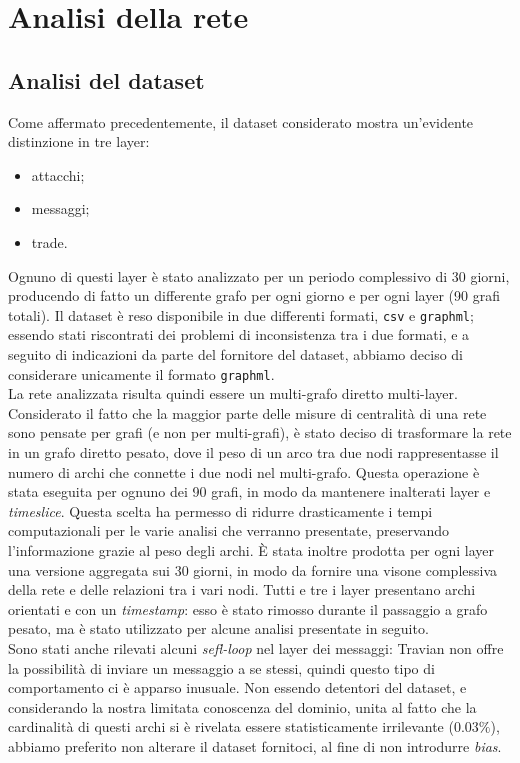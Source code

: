 \chapter{Analisi della rete}
\section{Analisi del dataset}
Come affermato precedentemente, il dataset considerato mostra un'evidente distinzione in tre layer:
\begin{itemize}
	\item attacchi;
	\item messaggi;
	\item trade.
\end{itemize}
Ognuno di questi layer è stato analizzato per un periodo complessivo di 30 giorni, producendo di fatto un differente grafo per ogni giorno e per ogni layer (90 grafi totali).
Il dataset è reso disponibile in due differenti formati, \texttt{csv} e \texttt{graphml}; essendo stati riscontrati dei problemi di inconsistenza tra i due formati, e a seguito di indicazioni da parte del fornitore del dataset, abbiamo deciso di considerare unicamente il formato \texttt{graphml}.\\

La rete analizzata risulta quindi essere un multi-grafo diretto multi-layer. Considerato il fatto che la maggior parte delle misure di centralità di una rete sono pensate per grafi (e non per multi-grafi), è stato deciso di trasformare la rete in un grafo diretto pesato, dove il peso di un arco tra due nodi rappresentasse il numero di archi che connette i due nodi nel multi-grafo. Questa operazione è stata eseguita per ognuno dei 90 grafi, in modo da mantenere inalterati layer e \textit{timeslice}. Questa scelta ha permesso di ridurre drasticamente i tempi computazionali per le varie analisi che verranno presentate, preservando l'informazione grazie al peso degli archi.
È stata inoltre prodotta per ogni layer una versione aggregata sui 30 giorni, in modo da fornire una visone complessiva della rete e delle relazioni tra i vari nodi.
Tutti e tre i layer presentano archi orientati e con un \textit{timestamp}: esso è stato rimosso durante il passaggio a grafo pesato, ma è stato utilizzato per alcune analisi presentate in seguito.\\
Sono stati anche rilevati alcuni \textit{sefl-loop} nel layer dei messaggi: Travian non offre la possibilità di inviare un messaggio a se stessi, quindi questo tipo di comportamento ci è apparso inusuale. Non essendo detentori del dataset, e considerando la nostra limitata conoscenza del dominio, unita al fatto che la cardinalità di questi archi si è rivelata essere statisticamente irrilevante ($0.03\%$), abbiamo preferito non alterare il dataset fornitoci, al fine di non introdurre \textit{bias}.

